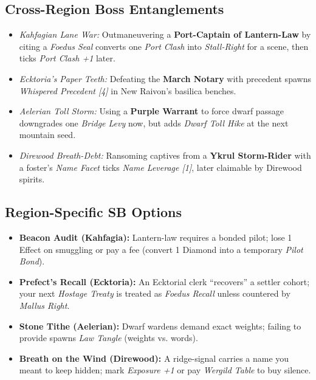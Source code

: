 \subsection*{Cross-Region Boss Entanglements}
\begin{itemize}
  \item \emph{Kahfagian Lane War:} Outmaneuvering a \textbf{Port-Captain of Lantern-Law} by citing a \emph{Foedus Seal} converts one \emph{Port Clash} into \emph{Stall-Right} for a scene, then ticks \emph{Port Clash +1} later.
  \item \emph{Ecktoria’s Paper Teeth:} Defeating the \textbf{March Notary} with precedent spawns \emph{Whispered Precedent [4]} in New Raivon’s basilica benches.
  \item \emph{Aelerian Toll Storm:} Using a \textbf{Purple Warrant} to force dwarf passage downgrades one \emph{Bridge Levy} now, but adds \emph{Dwarf Toll Hike} at the next mountain seed.
  \item \emph{Direwood Breath-Debt:} Ransoming captives from a \textbf{Ykrul Storm-Rider} with a foster’s \emph{Name Facet} ticks \emph{Name Leverage [1]}, later claimable by Direwood spirits.
\end{itemize}

\subsection*{Region-Specific SB Options}
\begin{itemize}
  \item \textbf{Beacon Audit (Kahfagia):} Lantern-law requires a bonded pilot; lose 1 Effect on smuggling or pay a fee (convert 1 Diamond into a temporary \emph{Pilot Bond}).
  \item \textbf{Prefect’s Recall (Ecktoria):} An Ecktorial clerk “recovers” a settler cohort; your next \emph{Hostage Treaty} is treated as \emph{Foedus Recall} unless countered by \emph{Mallus Right}.
  \item \textbf{Stone Tithe (Aelerian):} Dwarf wardens demand exact weights; failing to provide spawns \emph{Law Tangle} (weights vs. words).
  \item \textbf{Breath on the Wind (Direwood):} A ridge-signal carries a name you meant to keep hidden; mark \emph{Exposure +1} or pay \emph{Wergild Table} to buy silence.
\end{itemize}


